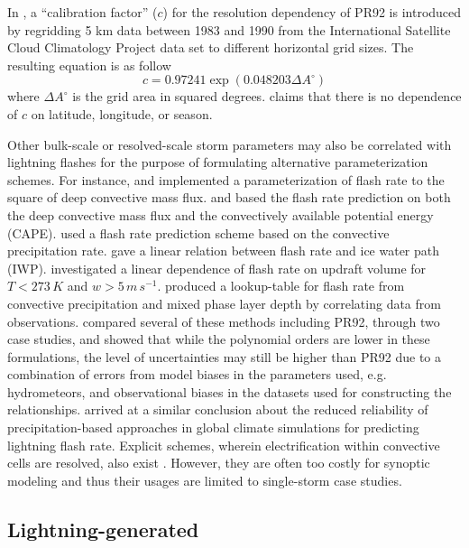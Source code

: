 	In \citet{Price:1994fk}, a ``calibration factor'' ($c$) for the resolution dependency of PR92 is introduced by regridding 5 km data between 1983 and 1990 from the International Satellite Cloud Climatology Project data set \citep[ISCCP;][]{Rossow:1991aa} to different horizontal grid sizes. The resulting equation is as follow
	\begin{equation}\label{eqn:pr94-calib}
		c = 0.97241\exp(0.048203 \Delta A^\circ)
	\end{equation}
	where $\Delta A^\circ$ is the grid area in squared degrees. \citet{Price:1994fk} claims that there is no dependence of $c$ on latitude, longitude, or season.

	Other bulk-scale or resolved-scale storm parameters may also be correlated with lightning flashes for the purpose of formulating alternative parameterization schemes. For instance, \citet{Allen:2002fk} and \citet{Allen:2010fk} implemented a parameterization of flash rate to the square of deep convective mass flux. \citet{Zhao:2009kx} and \citet{Choi:2005uq} based the flash rate prediction on both the deep convective mass flux and the convectively available potential energy (CAPE). \citet{Allen:2012fk} used a flash rate prediction scheme based on the convective precipitation rate. \citet{Petersen:2005fk} gave a linear relation between flash rate and ice water path (IWP). \citet{Deierling:2008uq} investigated a linear dependence of flash rate on updraft volume for $T<273\,\unit{K}$ and $w>5\,\unit{m\,s^{-1}}$. \citet{Hansen:2012aa} produced a lookup-table for flash rate from convective precipitation and mixed phase layer depth by correlating data from observations. \citet{Barthe:2010uq} compared several of these methods including PR92, through two case studies, and showed that while the polynomial orders are lower in these formulations, the level of uncertainties may still be higher than PR92 due to a combination of errors from model biases in the parameters used, e.g. hydrometeors, and observational biases in the datasets used for constructing the relationships. \citet{Futyan:2007fk} arrived at a similar conclusion about the reduced reliability of precipitation-based approaches in global climate simulations for predicting lightning flash rate. Explicit schemes, wherein electrification within convective cells are resolved, also exist \citep[e.g.][]{Barthe:2005zr,Zhang:2003tp}. However, they are often too costly for synoptic modeling and thus their usages are limited to single-storm case studies.

\subsection{Lightning-generated } \label{ssec:intro/lightning/lnox}
	
